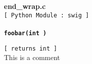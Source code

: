 \setlength{\parindent}{0.0in}
\setlength{\textwidth}{6.5in}
\setlength{\oddsidemargin}{0.0in}
\pagestyle{headings}

{\Large \bf  end\_wrap.c }\\
{\tt [ Python Module : swig ]  }\\
\\{\tt \bf foobar(int ) }
\\
\makebox[0.5in]{}\begin{minipage}[t]{6in}
{\tt [ returns int  ]  }\\
   This is a comment   
\\

\end{minipage}\\



